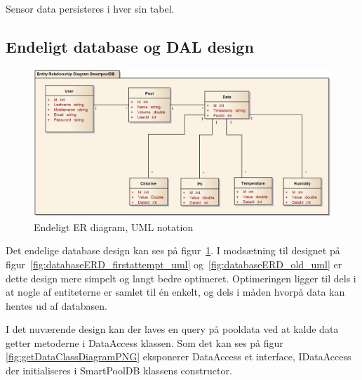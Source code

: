 Sensor data persisteres i hver sin tabel.

\subsection{Endeligt database og DAL design}

\begin{figure}[h]
	\centering
	\includegraphics[width=\linewidth]{figs/design/databaseERD_final_uml}
	\caption{Endeligt ER diagram, UML notation}
	\label{fig:databaseERD_final_uml}
\end{figure}

Det endelige database design kan ses på figur~\ref{fig:databaseERD_final_uml}. I modsætning til designet på figur~\ref{fig:databaseERD_firstattempt_uml} og~\ref{fig:databaseERD_old_uml} er dette design mere simpelt og langt bedre optimeret. Optimeringen ligger til dels i at nogle af entiteterne er samlet til én enkelt, og dels i måden hvorpå data kan hentes ud af databasen. 


I det nuværende design kan der laves en query på pooldata ved at kalde data getter metoderne i DataAccess klassen. Som det kan ses på figur \ref{fig:getDataClassDiagramPNG} eksponerer DataAccess et interface, IDataAccess der initialiseres i SmartPoolDB klassens constructor.


